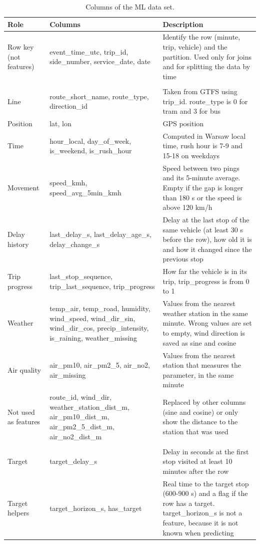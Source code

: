 \documentclass[11pt]{article}
\begin{document}
\begin{table}[H]
\centering
\small
\caption{Columns of the ML data set.}\label{tab:ml}
\begin{tabular}{|>{\raggedright\arraybackslash}p{2.4cm}|>{\raggedright\arraybackslash}p{4.4cm}|>{\raggedright\arraybackslash}p{6.6cm}|}
\hline
\textbf{Role} & \textbf{Columns} & \textbf{Description} \\
\hline
Row key (not features) & event\_time\_utc, trip\_id, side\_number, service\_date, date & Identify the row (minute, trip, vehicle) and the partition. Used only for joins and for splitting the data by time \\
\hline
\multicolumn{3}{|l|}{\textit{Independent features (30)}} \\
\hline
Line & route\_short\_name, route\_type, direction\_id & Taken from GTFS using trip\_id. route\_type is 0 for tram and 3 for bus \\
\hline
Position & lat, lon & GPS position \\
\hline
Time & hour\_local, day\_of\_week, is\_weekend, is\_rush\_hour & Computed in Warsaw local time, rush hour is 7-9 and 15-18 on weekdays \\
\hline
Movement & speed\_kmh, speed\_avg\_5min\_kmh & Speed between two pings and its 5-minute average. Empty if the gap is longer than 180 s or the speed is above 120 km/h \\
\hline
Delay history & last\_delay\_s, last\_delay\_age\_s, delay\_change\_s & Delay at the last stop of the same vehicle (at least 30 s before the row), how old it is and how it changed since the previous stop \\
\hline
Trip progress & last\_stop\_sequence, trip\_last\_sequence, trip\_progress & How far the vehicle is in its trip, trip\_progress is from 0 to 1 \\
\hline
Weather & temp\_air, temp\_road, humidity, wind\_speed, wind\_dir\_sin, wind\_dir\_cos, precip\_intensity, is\_raining, weather\_missing & Values from the nearest weather station in the same minute. Wrong values are set to empty, wind direction is saved as sine and cosine \\
\hline
Air quality & air\_pm10, air\_pm2\_5, air\_no2, air\_missing & Values from the nearest station that measures the parameter, in the same minute \\
\hline
Not used as features & route\_id, wind\_dir, weather\_station\_dist\_m, air\_pm10\_dist\_m, air\_pm2\_5\_dist\_m, air\_no2\_dist\_m & Replaced by other columns (sine and cosine) or only show the distance to the station that was used \\
\hline
\multicolumn{3}{|l|}{\textit{Dependent variable}} \\
\hline
Target & target\_delay\_s & Delay in seconds at the first stop visited at least 10 minutes after the row \\
\hline
Target helpers & target\_horizon\_s, has\_target & Real time to the target stop (600-900 s) and a flag if the row has a target. target\_horizon\_s is not a feature, because it is not known when predicting \\
\hline
\end{tabular}
\end{table}
\end{document}
